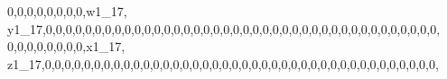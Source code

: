 \documentclass[]{article}
\newenvironment{Shaded}{\begin{snugshade}}{\end{snugshade}}
\newcommand{\DecValTok}[1]{\textcolor[rgb]{0.00,0.00,0.81}{#1}}
\newcommand{\NormalTok}[1]{#1}
\begin{document}
\begin{Shaded}
\begin{Highlighting}[]
\DecValTok{0}\NormalTok{,}\DecValTok{0}\NormalTok{,}\DecValTok{0}\NormalTok{,}\DecValTok{0}\NormalTok{,}\DecValTok{0}\NormalTok{,}\DecValTok{0}\NormalTok{,}\DecValTok{0}\NormalTok{,}\DecValTok{0}\NormalTok{,w1_}\DecValTok{17}\NormalTok{, y1_}\DecValTok{17}\NormalTok{,}\DecValTok{0}\NormalTok{,}\DecValTok{0}\NormalTok{,}\DecValTok{0}\NormalTok{,}\DecValTok{0}\NormalTok{,}\DecValTok{0}\NormalTok{,}\DecValTok{0}\NormalTok{,}\DecValTok{0}\NormalTok{,}\DecValTok{0}\NormalTok{,}\DecValTok{0}\NormalTok{,}\DecValTok{0}\NormalTok{,}\DecValTok{0}\NormalTok{,}\DecValTok{0}\NormalTok{,}\DecValTok{0}\NormalTok{,}\DecValTok{0}\NormalTok{,}\DecValTok{0}\NormalTok{,}\DecValTok{0}\NormalTok{,}\DecValTok{0}\NormalTok{,}\DecValTok{0}\NormalTok{,}\DecValTok{0}\NormalTok{,}\DecValTok{0}\NormalTok{,}\DecValTok{0}\NormalTok{,}\DecValTok{0}\NormalTok{,}\DecValTok{0}\NormalTok{,}\DecValTok{0}\NormalTok{,}\DecValTok{0}\NormalTok{,}\DecValTok{0}\NormalTok{,}\DecValTok{0}\NormalTok{,}\DecValTok{0}\NormalTok{,}\DecValTok{0}\NormalTok{,}\DecValTok{0}\NormalTok{,}\DecValTok{0}\NormalTok{,}\DecValTok{0}\NormalTok{,}\DecValTok{0}\NormalTok{,}\DecValTok{0}\NormalTok{,}\DecValTok{0}\NormalTok{,}\DecValTok{0}\NormalTok{,}\DecValTok{0}\NormalTok{,}\DecValTok{0}\NormalTok{,}\DecValTok{0}\NormalTok{,}\DecValTok{0}\NormalTok{,}
\DecValTok{0}\NormalTok{,}\DecValTok{0}\NormalTok{,}\DecValTok{0}\NormalTok{,}\DecValTok{0}\NormalTok{,}\DecValTok{0}\NormalTok{,}\DecValTok{0}\NormalTok{,}\DecValTok{0}\NormalTok{,}\DecValTok{0}\NormalTok{,x1_}\DecValTok{17}\NormalTok{, z1_}\DecValTok{17}\NormalTok{,}\DecValTok{0}\NormalTok{,}\DecValTok{0}\NormalTok{,}\DecValTok{0}\NormalTok{,}\DecValTok{0}\NormalTok{,}\DecValTok{0}\NormalTok{,}\DecValTok{0}\NormalTok{,}\DecValTok{0}\NormalTok{,}\DecValTok{0}\NormalTok{,}\DecValTok{0}\NormalTok{,}\DecValTok{0}\NormalTok{,}\DecValTok{0}\NormalTok{,}\DecValTok{0}\NormalTok{,}\DecValTok{0}\NormalTok{,}\DecValTok{0}\NormalTok{,}\DecValTok{0}\NormalTok{,}\DecValTok{0}\NormalTok{,}\DecValTok{0}\NormalTok{,}\DecValTok{0}\NormalTok{,}\DecValTok{0}\NormalTok{,}\DecValTok{0}\NormalTok{,}\DecValTok{0}\NormalTok{,}\DecValTok{0}\NormalTok{,}\DecValTok{0}\NormalTok{,}\DecValTok{0}\NormalTok{,}\DecValTok{0}\NormalTok{,}\DecValTok{0}\NormalTok{,}\DecValTok{0}\NormalTok{,}\DecValTok{0}\NormalTok{,}\DecValTok{0}\NormalTok{,}\DecValTok{0}\NormalTok{,}\DecValTok{0}\NormalTok{,}\DecValTok{0}\NormalTok{,}\DecValTok{0}\NormalTok{,}\DecValTok{0}\NormalTok{,}\DecValTok{0}\NormalTok{,}\DecValTok{0}\NormalTok{,}\DecValTok{0}\NormalTok{,}\DecValTok{0}\NormalTok{,}\DecValTok{0}\NormalTok{,}\DecValTok{0}\NormalTok{,}

\end{Highlighting}
\end{Shaded}
\end{document}
